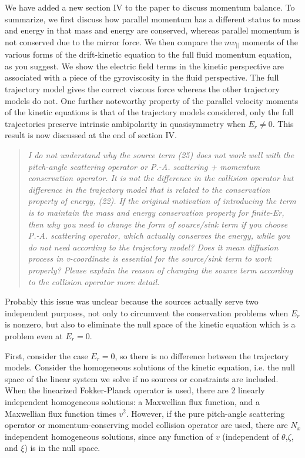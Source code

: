 \documentclass[11pt]{article}
\newenvironment{referee}{\begin{quote}\it\color{Blue}}{\end{quote}}
\begin{document}
We have added a new section IV to the paper to discuss momentum balance.
To summarize, we first discuss how parallel momentum has a different status to mass and energy in that mass and
energy are conserved, whereas parallel momentum is not conserved due to the mirror force.
We then compare the $m v_{||}$ moments of the various forms of the drift-kinetic
equation to the full fluid momentum equation, as you suggest.
We show the electric field terms in the kinetic perspective
are associated with a piece of the gyroviscosity in the fluid perspective.  The full trajectory model
gives the correct viscous force whereas the other trajectory models do not.
One further noteworthy property of the parallel velocity moments of the kinetic equations
is that of the trajectory models considered, only the full trajectories preserve intrinsic
ambipolarity in quasisymmetry when $E_r \ne 0$. This result is now discussed at the end of section IV.

\begin{referee}
I do not understand why the source term (25) does not work well with the pitch-angle scattering
operator or P.-A. scattering + momentum conservation operator. It is not the difference in the
collision operator but difference in the trajectory model that is related to the conservation
property of energy, (22). If the original motivation of introducing the term is to maintain the
mass and energy conservation property for finite-Er, then why you need to change the form of
source/sink term if you choose P.-A. scattering operator, which actually conserves the energy,
while you do not need according to the trajectory model? Does it mean diffusion process in
v-coordinate is essential for the source/sink term to work properly?
Please explain the reason of changing the source term according to the collision operator more
detail.
\end{referee}

Probably this issue was unclear because the sources actually serve two independent purposes,
not only to circumvent the conservation problems when $E_r$ is nonzero, but also to eliminate the null
space of the kinetic equation which is a problem even at $E_r=0$.

First, consider the case $E_r=0$, so there is no difference between the trajectory models.
Consider the homogeneous solutions of the kinetic equation, i.e. the null space of the linear system
we solve if no sources or constraints are included. 
When the linearized Fokker-Planck operator is used, 
there are 2 linearly independent homogeneous solutions:
a Maxwellian flux function,
and a Maxwellian flux function times $v^2$.
However, if the pure pitch-angle scattering operator or momentum-conserving model
collision operator are used, there are $N_x$ independent homogeneous solutions,
since any function of $v$ (independent of $\theta$,$\zeta$, and $\xi$)
is in the null space. 
\end{document}

